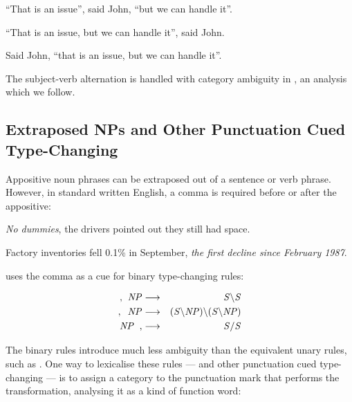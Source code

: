 \begin{lexamples}
\item ``That is an issue'', said John, ``but we can handle it''.
\item ``That is an issue, but we can handle it'', said John.
\item * Said John, ``that is an issue, but we can handle it''.
\end{lexamples}

The subject-verb alternation is handled with category ambiguity in \ccgbank, an
analysis which we follow.


\subsection{Extraposed NPs and Other Punctuation Cued Type-Changing}
\label{sec:extraposition}

Appositive noun phrases can be extraposed out of a sentence or verb phrase.
However, in standard written English, a
comma is required before or after the appositive:
\begin{lexamples}
 \item \emph{No dummies}, the drivers pointed out they still had space.
 \item Factory inventories fell 0.1\% in September, \emph{the first decline
since February 1987}.
\end{lexamples}

\ccgbank uses the comma as a cue for binary type-changing rules:

\begin{eqnarray}
\mbox{$\it{,}$}\;\;\mbox{$\it{NP}$} & \longrightarrow & \mbox{$\it{S\backslash S}$}\\
,\;\;\mbox{$\it{NP}$} & \longrightarrow & \mbox{$\it{(S\backslash NP)\backslash(S\backslash NP)}$}\\
\mbox{$\it{NP}$}\;\;\mbox{$\it{,}$} & \longrightarrow & \mbox{$\it{S/S}$}
\end{eqnarray}

The binary rules introduce much less ambiguity than the equivalent unary rules,
such as . One way to lexicalise these rules ---
and other punctuation cued type-changing --- is to assign a category to the
punctuation mark that performs the transformation, analysing it as a kind of
function word:

\begin{center}
\end{center}

